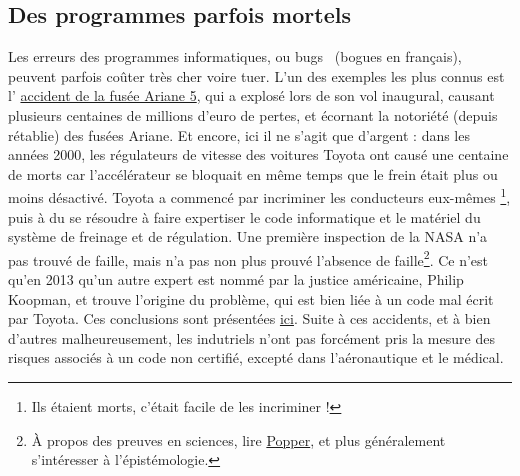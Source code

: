 \documentclass[10pt]{article}
\begin{document}
\subsection{Des programmes parfois mortels}

Les erreurs des programmes informatiques, ou \og bugs \fg~(bogues en français), peuvent parfois coûter très cher voire tuer.
L'un des exemples les plus connus est l'
\href{https://fr.wikipedia.org/wiki/Vol_501_d\%27Ariane_5}{accident de la fusée Ariane 5},
qui a explosé lors de son vol inaugural, causant plusieurs centaines de millions d'euro de pertes, et écornant
la notoriété (depuis rétablie) des fusées Ariane. Et encore, ici il ne s'agit que d'argent :
dans les années 2000, les régulateurs de vitesse des voitures Toyota ont causé une centaine de morts car
l'accélérateur se bloquait en même temps que le frein était plus ou moins désactivé.
Toyota a commencé par incriminer les conducteurs eux-mêmes \footnote{Ils étaient morts,
  c'était facile de les incriminer !}, puis à du se résoudre à faire expertiser le code informatique et le matériel du
système de freinage et de régulation. Une première inspection de la NASA n'a pas trouvé de faille, mais n'a pas non plus
prouvé l'absence de faille\footnote{
  À propos des preuves en sciences, lire \href{https://fr.wikipedia.org/wiki/Karl_Popper}{Popper}, et plus généralement
s'intéresser à l'épistémologie.}.
Ce n'est qu'en 2013 qu'un autre expert est nommé par la justice américaine, Philip Koopman, et trouve l'origine du problème, qui est bien
liée à un code mal écrit par Toyota. Ces conclusions sont présentées \href{https://users.ece.cmu.edu/~koopman/pubs/koopman14_toyota_ua_slides.pdf}{ici}.
Suite à ces accidents, et à bien d'autres malheureusement, les indutriels n'ont pas forcément pris la mesure des risques associés à un code non certifié,
excepté dans l'aéronautique et le médical.
\end{document}
